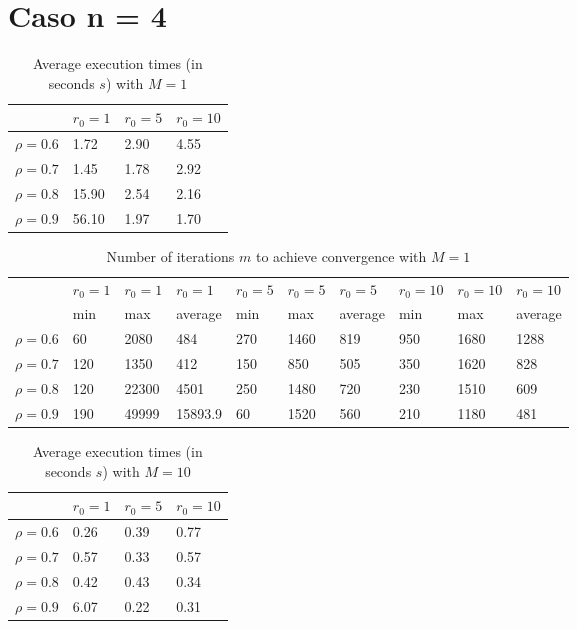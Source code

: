 \documentclass[a4paper,11pt,openright]{report}
\begin{document}
\section*{Caso n = 4}  
\begin{table}[H]
\centering
\addtolength{\leftskip}{-1.5cm}
\addtolength{\rightskip}{-1.5cm}
\begin{tabular}{|c|lll|}
\hline
$ $ & $r_0 = 1$ & $r_0 = 5$ & $r_0 = 10$ \\
\hline
$\rho = 0.6$ & 1.72 & 2.90 & 4.55 \\

$\rho = 0.7$ & 1.45 & 1.78 & 2.92 \\

$\rho = 0.8$ & 15.90 & 2.54 & 2.16 \\

$\rho = 0.9$ & 56.10 & 1.97 & 1.70 \\
\hline
\end{tabular}
\caption{Average execution
 times (in seconds $s$) with $M = 1$}
\end{table}
\begin{table}[H]
\centering
\addtolength{\leftskip}{-1.5cm}
\addtolength{\rightskip}{-1.5cm}
\begin{tabular}{|c|lllllllll|}
\hline
$ $ & $r_0 = 1$ & $r_0 = 1$ & $r_0 = 1$ & $r_0 = 5$ & $r_0 = 5$ & $r_0 = 5$ & $r_0 = 10$ & $r_0 = 10$ & $r_0 = 10$  \\
$ $ & min & max & average & min & max & average & min & max & average \\ 
\hline
$\rho = 0.6$ & 60 & 2080 & 484 & 270 & 1460 & 819 & 950 & 1680 & 1288 \\

$\rho = 0.7$ & 120 & 1350 & 412 & 150 & 850 & 505 & 350 & 1620 & 828\\

$\rho = 0.8$ & 120 & 22300 & 4501 & 250 & 1480 & 720 & 230 & 1510 & 609\\

$\rho = 0.9$ & 190 & 49999 & 15893.9 & 60 & 1520 & 560 & 210 & 1180 & 481\\
\hline
\end{tabular}
\caption{Number of iterations $m$ to achieve convergence with $M = 1$}
\end{table}
\begin{table}[H]
\centering
\addtolength{\leftskip}{-1.5cm}
\addtolength{\rightskip}{-1.5cm}
\begin{tabular}{|c|lll|}
\hline
$ $ & $r_0 = 1$ & $r_0 = 5$ & $r_0 = 10$ \\
\hline
$\rho = 0.6$ & 0.26 & 0.39 & 0.77 \\

$\rho = 0.7$ & 0.57 & 0.33 & 0.57 \\

$\rho = 0.8$ & 0.42 & 0.43 & 0.34 \\

$\rho = 0.9$ & 6.07 & 0.22 & 0.31 \\
\hline
\end{tabular}
\caption{Average execution
 times (in seconds $s$) with $M = 10$}
\end{table}
\end{document}
